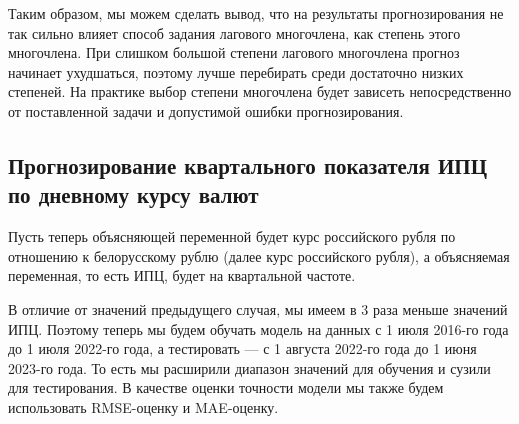 \documentclass[a4paper, 14pt]{extarticle}
\begin{document}
		
		Таким образом, мы можем сделать вывод, что на результаты прогнозирования не так сильно влияет способ задания лагового многочлена, как степень этого многочлена. При слишком большой степени лагового многочлена прогноз начинает ухудшаться, поэтому лучше перебирать среди достаточно низких степеней. На практике выбор степени многочлена будет зависеть непосредственно от поставленной задачи и допустимой ошибки прогнозирования.
		
		\subsection{Прогнозирование квартального показателя ИПЦ по дневному курсу валют}
		Пусть теперь объясняющей переменной будет курс российского рубля по отношению к белорусскому рублю (далее курс российского рубля), а объясняемая переменная, то есть ИПЦ, будет на квартальной частоте.
		
		В отличие от значений предыдущего случая, мы имеем в 3 раза меньше значений ИПЦ. Поэтому теперь мы будем обучать модель на данных с 1 июля 2016-го года до 1 июля 2022-го года, а тестировать --- с 1 августа 2022-го года до 1 июня 2023-го года. То есть мы расширили диапазон значений для обучения и сузили для тестирования. В качестве оценки точности модели мы также будем использовать RMSE-оценку и MAE-оценку.
		
\end{document}
